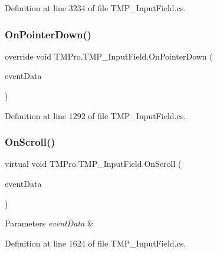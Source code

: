 Definition at line 3234 of file T\+M\+P\+\_\+\+Input\+Field.\+cs.

\mbox{\label{class_t_m_pro_1_1_t_m_p___input_field_a9b56bc090d1633c3452c7be950b9b373}} 
\subsubsection{\texorpdfstring{OnPointerDown()}{OnPointerDown()}}
{\footnotesize\ttfamily override void T\+M\+Pro.\+T\+M\+P\+\_\+\+Input\+Field.\+On\+Pointer\+Down (\begin{DoxyParamCaption}\item[{Pointer\+Event\+Data}]{event\+Data }\end{DoxyParamCaption})}



Definition at line 1292 of file T\+M\+P\+\_\+\+Input\+Field.\+cs.

\mbox{\label{class_t_m_pro_1_1_t_m_p___input_field_a459befbf2b33143cbcf80cf32f1953b8}} 
\subsubsection{\texorpdfstring{OnScroll()}{OnScroll()}}
{\footnotesize\ttfamily virtual void T\+M\+Pro.\+T\+M\+P\+\_\+\+Input\+Field.\+On\+Scroll (\begin{DoxyParamCaption}\item[{Pointer\+Event\+Data}]{event\+Data }\end{DoxyParamCaption})\hspace{0.3cm}{\ttfamily [virtual]}}






\begin{DoxyParams}{Parameters}
{\em event\+Data} & \\
\hline
\end{DoxyParams}


Definition at line 1624 of file T\+M\+P\+\_\+\+Input\+Field.\+cs.

\mbox{\label{class_t_m_pro_1_1_t_m_p___input_field_a7bfcd4822d6fa704e155a822fd357879}} 
